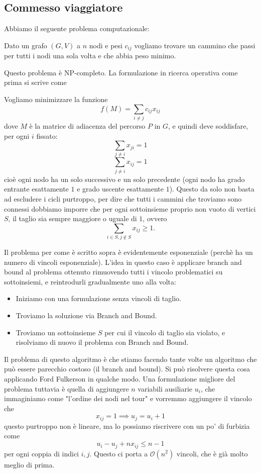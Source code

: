 \documentclass[11pt]{scrartcl}
\begin{document}
	\subsection{Commesso viaggiatore}
	Abbiamo il seguente problema computazionale:
	\begin{problem}
		Dato un grafo $(G,V)$ a $n$ nodi e pesi $c_{ij}$ vogliamo trovare un cammino che passi per tutti i nodi una sola volta e che abbia peso minimo.
	\end{problem}
	Questo problema è NP-completo. La formulazione in ricerca operativa come prima si scrive come
	\begin{problem}[TSP2]
		Vogliamo minimizzare la funzione
		$$f(M)=\sum_{i\ne j}c_{ij}x_{ij}$$
		dove $M$ è la matrice di adiacenza del percorso $P$ in $G$, e quindi deve soddisfare, per ogni $i$ fissato:
		$$\sum_{j\ne i}x_{ji}=1$$
		$$\sum_{j\ne i}x_{ij}=1$$
		cioè ogni nodo ha un solo successivo e un solo precedente (ogni nodo ha grado entrante esattamente $1$ e grado uscente esattamente $1$). Questo da solo non basta ad escludere i cicli purtroppo, per dire che tutti i cammini che troviamo sono connessi dobbiamo imporre che per ogni sottoinsieme proprio non vuoto di vertici $S$, il taglio sia sempre maggiore o uguale di $1$, ovvero
		$$\sum_{i\in S,j\not\in S}x_{ij}\ge 1.$$
	\end{problem}
	Il problema per come è scritto sopra è evidentemente esponenziale (perchè ha un numero di vincoli esponenziale). L'idea in questo caso è applicare branch and bound al problema ottenuto rimuovendo tutti i vincolo problematici su sottoinsiemi, e reintrodurli gradualmente uno alla volta:
	\begin{itemize}
		\item Iniziamo con una formulazione senza vincoli di taglio. 
		\item Troviamo la soluzione via Branch and Bound.
		\item Troviamo un sottoinsieme $S$ per cui il vincolo di taglio sia violato, e risolviamo di nuovo il problema con Branch and Bound.
	\end{itemize}
	Il problema di questo algoritmo è che stiamo facendo tante volte un algoritmo che può essere parecchio costoso (il branch and bound). Si può risolvere questa cosa applicando Ford Fulkerson in qualche modo. Una formulazione migliore del problema tuttavia è quella di aggiungere $n$ variabili ausiliarie $u_i$, che immaginiamo come "l'ordine dei nodi nel tour" e vorremmo aggiungere il vincolo che
	$$x_{ij}=1 \implies u_j= u_i+1$$
	questo purtroppo non è lineare, ma lo possiamo riscrivere con un po' di furbizia come
	$$u_i-u_j+nx_{ij}\le n-1$$
	per ogni coppia di indici $i,j$. Questo ci porta a $\mathcal{O}\!\left(n^2\right)$ vincoli, che è già molto meglio di prima.
\end{document}
